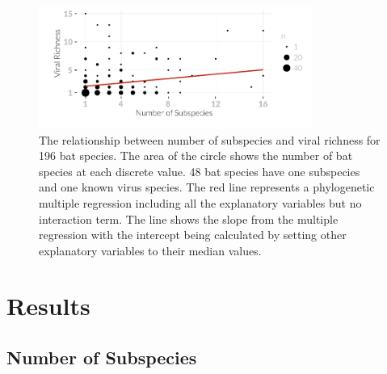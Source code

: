 		
\begin{knitrout}\footnotesize
{}\color{fgcolor}\begin{figure}[t]

{\centering \includegraphics[width=0.8\textwidth]{figure/boxplot-1} 

}

\caption[The relationship between number of subspecies and viral richness for 196 bat species.]{The relationship between number of subspecies and viral richness for 196 bat species.
The area of the circle shows the number of bat species at each discrete value.
48 bat species have one subspecies and one known virus species.
The red line represents a phylogenetic multiple regression including all the explanatory variables but no interaction term.
The line shows the slope from the multiple regression with the intercept being calculated by setting other explanatory variables to their median values.
}\label{fig:boxplot}
\end{figure}


\end{knitrout}



\section{Results}




\subsection{Number of Subspecies}

